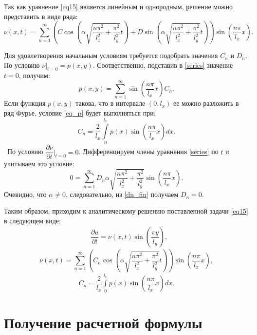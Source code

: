 {Так как уравнение \eqref{eq15} является линейным и однородным, решение можно представить в виде ряда:
	\begin{equation}\label{series}
	\nu(x,t) = \sum_{n=1}^{\infty}{(C\cos(\alpha\sqrt{\dfrac{n\pi^2}{l_x^2} + \dfrac{\pi^2}{l_y^2}}t) + 
	D\sin(\alpha\sqrt{\dfrac{n\pi^2}{l_x^2} + \dfrac{\pi^2}{l_y^2}}t)) \sin(\dfrac{n\pi}{l_x}x)}.
	\end{equation}	 
	
Для удовлетворения начальным условиям требуется подобрать значения $C_n$ и $D_n$. По условию $\nu|_{t=0} = p(x,y)$. Соответственно, подставив в \eqref{series} значение $t=0$, получим:
	\begin{equation}\label{eq_p}
	p(x,y) = \sum_{n=1}^{\infty}{\sin(\dfrac{n\pi}{l_x}x)C_n}.
	\end{equation}
Если функция $p(x,y)$ такова, что в интервале $(0, l_x)$ ее можно разложить в ряд Фурье, условие \eqref{eq_p} будет выполняться при:
	\begin{equation}\label{cn_fin}
	C_n = \dfrac{2}{l_x}\int\limits_{0}^{l_x}{p(x)\sin(\dfrac{n\pi}{l_x}x)dx}.
	\end{equation}\
По условию $\dfrac{\partial \nu}{\partial t}|_{t=0} = 0$. Дифференцируем члены уравнения \eqref{series} по $t$ и учитываем это условие:
	\begin{equation}\label{dn_fin}
	0 = \sum_{n=1}^{\infty}{D_n\alpha\sqrt{\dfrac{n\pi^2}{l_x^2} + \dfrac{\pi^2}{l_y^2}}\sin(\dfrac{n\pi}{l_x}x)}.
	\end{equation}
Очевидно, что $\alpha\neq 0$, следовательно, из \eqref{dn_fin} получаем $D_n = 0$.  

Таким образом, приходим к аналитическому решению поставленной задачи \eqref{eq15} в следующем виде:
	\begin{align*}
  	&\dfrac{\partial u}{\partial t} = \nu(x,t)\sin (\dfrac{\pi y}{l_y}),
   	\end{align*}
   	\begin{equation}\label{final_series}
   	\nu(x,t) = \sum_{n=1}^{\infty}{(C_n\cos(\alpha\sqrt{\dfrac{n\pi^2}{l_x^2} + \dfrac{\pi^2}{l_y^2}}t)) \sin(\dfrac{n\pi}{l_x}x)},
	\end{equation}
	\begin{align*}
	C_n = \dfrac{2}{l_x}\int\limits_{0}^{l_x}{p(x)\sin(\dfrac{n\pi}{l_x}x)dx}.
	\end{align*}   	   		



\newpage
\section{Получение расчетной формулы}
{

}}
